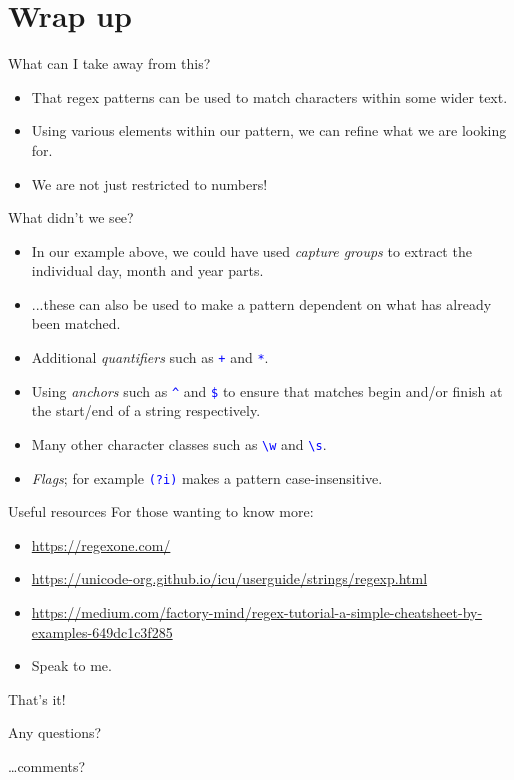 \documentclass[
	usenames,
	dvipsnames,
] {beamer}
\newcommand{\reWord}{\textbackslash{}w}
\newcommand{\reSpace}{\textbackslash{}s}
\newcommand{\rePattern}[1]{{\Large\texttt{\textcolor{blue}{#1}}}}
\begin{document}
\section{Wrap up}
\begin{frame}{What can I take away from this?}
	\begin{itemize}[label=\textbullet]
		\item That regex patterns can be used to match characters within some wider text.
			\pause
		\item Using various elements within our pattern, we can refine what we are looking for.
			\pause
		\item We are not just restricted to numbers!
	\end{itemize}
\end{frame}

\begin{frame}{What didn't we see?}
	\begin{itemize}[label=\textbullet]
		\item In our example above, we could have used \emph{capture groups} to extract the individual day, month and year parts.
			\pause
		\item ...these can also be used to make a pattern dependent on what has already been matched.
			\pause
		\item Additional \emph{quantifiers} such as \rePattern{+} and \rePattern{*}.
			\pause
		\item Using \emph{anchors} such as \rePattern{\^{}} and \rePattern{\$} to ensure that matches begin and/or finish at the start/end of a string respectively.
			\pause
		\item Many other character classes such as \rePattern{\reWord} and \rePattern{\reSpace}.
			\pause
		\item \emph{Flags}; for example \rePattern{(?i)} makes a pattern case-insensitive.
	\end{itemize}
\end{frame}

\begin{frame}{Useful resources}
	For those wanting to know more: \\
		\pause
	\medskip

	\begin{itemize}[label=\textbullet]
		\item \url{https://regexone.com/}
			\pause
		\item \url{https://unicode-org.github.io/icu/userguide/strings/regexp.html}
			\pause
		\item \url{https://medium.com/factory-mind/regex-tutorial-a-simple-cheatsheet-by-examples-649dc1c3f285}
			\pause
		\item Speak to me.
	\end{itemize}
\end{frame}

\begin{frame}{That's it!}
	\Huge
	\bfseries
	\begin{center}	
		Any questions?
		
		\ldots comments?
	\end{center}
\end{frame}
			
\end{document}
